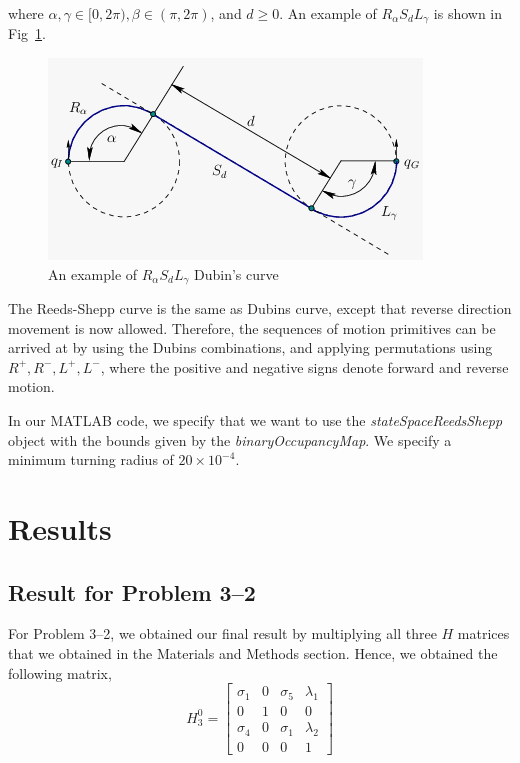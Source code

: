 \documentclass[conference]{IEEEtran}
\begin{document}
where $\alpha, \gamma \in [0, 2\pi), \beta \in (\pi, 2\pi)$, and $d \geq 0$. An example of
$R_\alpha S_d L_\gamma$ is shown in Fig~\ref{dubins-eg}.

\begin{figure}[h]
    \centering
    \includegraphics[scale=0.5]{dubins-img.png}
    \caption{An example of $R_\alpha S_d L_\gamma$ Dubin's curve}
    \label{dubins-eg}
\end{figure}

The Reeds-Shepp curve is the same as Dubins curve, except that reverse direction
movement is now allowed. Therefore, the sequences of motion primitives can be arrived
at by using the Dubins combinations, and applying permutations using $R^+, R^-, L^+, L^-$,
where the positive and negative signs denote forward and reverse motion.

In our MATLAB code, we specify that we want to use the \textit{stateSpaceReedsShepp} object with
the bounds given by the \textit{binaryOccupancyMap}. We specify a minimum turning radius
of $20 \times 10^{-4}$.

\section{Results}

\subsection{Result for Problem 3--2}

For Problem 3--2, we obtained our final result by multiplying all three $H$ matrices
that we obtained in the Materials and Methods section. Hence, we obtained the following
matrix,
\[
    H^0_3 =
    \begin{bmatrix}
        \sigma_1  & 0 & \sigma_5  & \lambda_1\\
        0 & 1 & 0 & 0\\
        \sigma_4  & 0 & \sigma_1  & \lambda_2\\
        0 & 0 & 0 & 1
    \end{bmatrix}
\]
\end{document}
